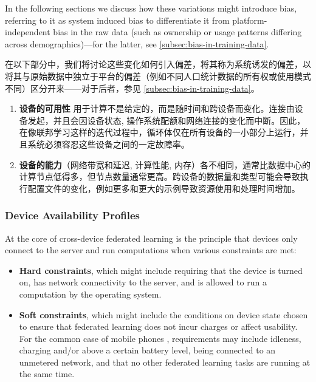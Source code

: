 In the following sections we discuss how these variations might introduce bias, referring to it as system induced bias to differentiate it from platform-independent bias in the raw data (such as ownership or usage patterns differing across demographics)---for the latter, see \cref{subsec:bias-in-training-data}.

在以下部分中，我们将讨论这些变化如何引入偏差，将其称为系统诱发的偏差，以将其与原始数据中独立于平台的偏差（例如不同人口统计数据的所有权或使用模式不同）区分开来——对于后者，参见 \cref{subsec:bias-in-training-data}。


\begin{enumerate}
    \item \textbf{设备的可用性} 用于计算不是给定的，而是随时间和跨设备而变化。连接由设备发起，并且会因设备状态, 操作系统配额和网络连接的变化而中断。因此，在像联邦学习这样的迭代过程中，循环体仅在所有设备的一小部分上运行，并且系统必须容忍这些设备之间的一定故障率。
    \item \textbf{设备的能力}（网络带宽和延迟, 计算性能, 内存）各不相同，通常比数据中心的计算节点低得多，但节点数量通常更高。跨设备的数据量和类型可能会导致执行配置文件的变化，例如更多和更大的示例导致资源使用和处理时间增加。
\end{enumerate}




\subsubsection{Device Availability Profiles}
At the core of cross-device federated learning is the principle that devices only connect to the server and run computations when various constraints are met:
\begin{itemize}
    \item \textbf{Hard constraints}, which might include requiring that the device is turned on, has network connectivity to the server, and is allowed to run a computation by the operating system.
    \item \textbf{Soft constraints}, which might include the conditions on device state chosen to ensure that federated learning does not incur charges or affect usability. For the common case of mobile phones \citep{bonawitz19sysml,apple19wwdc}, requirements may include idleness, charging and/or above a certain battery level, being connected to an unmetered network, and that no other federated learning tasks are running at the same time.
\end{itemize}

